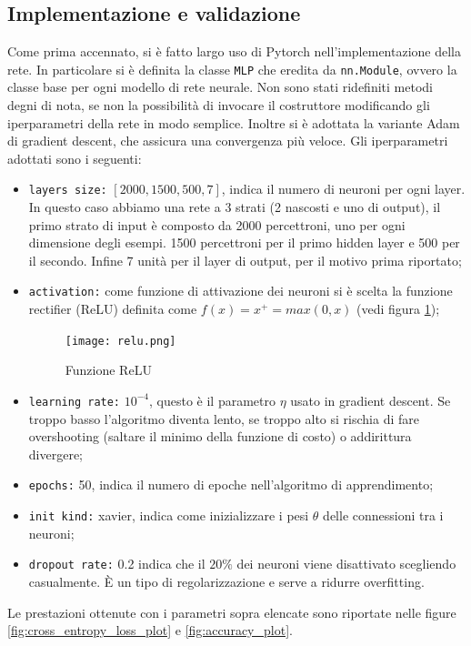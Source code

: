 \subsection{Implementazione e validazione}
Come prima accennato, si è fatto largo uso di Pytorch nell'implementazione della rete. In particolare si è definita la classe \verb|MLP| che eredita da \verb|nn.Module|, ovvero la classe base per ogni modello di rete neurale. Non sono stati ridefiniti metodi degni di nota, se non la possibilità di invocare il costruttore modificando gli iperparametri della rete in modo semplice. Inoltre si è adottata la variante Adam di gradient descent, che assicura una convergenza più veloce. Gli iperparametri adottati sono i seguenti:
\begin{itemize}
    \item \verb|layers size:| $[2000, 1500, 500, 7]$, indica il numero di neuroni per ogni layer. In questo caso abbiamo una rete a 3 strati (2 nascosti e uno di output), il primo strato di input è composto da 2000 percettroni, uno per ogni dimensione degli esempi. 1500 percettroni per il primo hidden layer e 500 per il secondo. Infine 7 unità per il layer di output, per il motivo prima riportato;
    \item \verb|activation:| come funzione di attivazione dei neuroni si è scelta la funzione rectifier (ReLU) definita come $f(x) = x^+ = max(0,x)$ (vedi figura \ref{fig:relu_func});
    \begin{figure}
        \centering
        \texttt{[image: relu.png]}
        \caption{Funzione ReLU}
        \label{fig:relu_func}
    \end{figure}
    \item \verb|learning rate:| $10^{-4}$, questo è il parametro $\eta$ usato in gradient descent. Se troppo basso l'algoritmo diventa lento, se troppo alto si rischia di fare overshooting (saltare il minimo della funzione di costo) o addirittura divergere;
    \item \verb|epochs:| 50, indica il numero di epoche nell'algoritmo di apprendimento;
    \item \verb|init kind:| xavier, indica come inizializzare i pesi $\theta$ delle connessioni tra i neuroni;
    \item \verb|dropout rate:| 0.2 indica che il $20\%$ dei neuroni viene disattivato scegliendo casualmente. È un tipo di regolarizzazione e serve a ridurre overfitting.
\end{itemize}
Le prestazioni ottenute con i parametri sopra elencate sono riportate nelle figure \ref{fig:cross_entropy_loss_plot} e \ref{fig:accuracy_plot}. 

